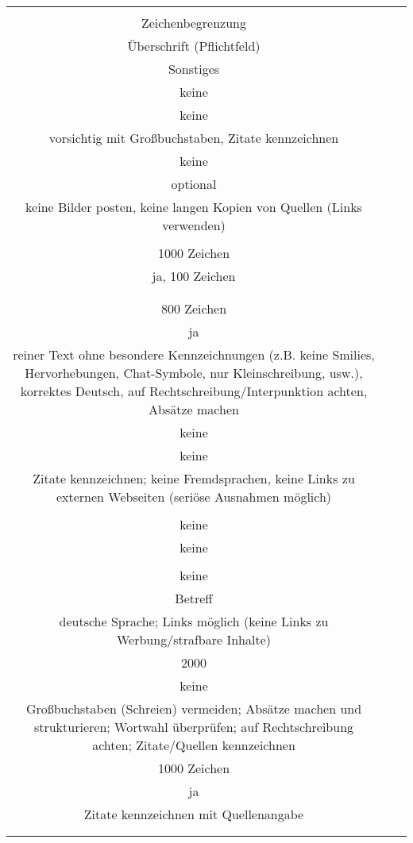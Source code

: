 \begin{landscape}
\begin{tabular}{ccc}
{Kommentar: formale Regeln\\
Zeichenbegrenzung\\
Überschrift (Pflichtfeld)\\
Sonstiges 
&		%
		\\
		keine\\
		keine\\
		vorsichtig mit Großbuchstaben, Zitate kennzeichnen	
		&
		\\
		keine\\
		optional\\
		keine Bilder posten, keine langen Kopien von Quellen (Links verwenden)\\
		&
		\\
		1000 Zeichen\\
		ja, 100 Zeichen\\
		\\
		&
		\\
		800 Zeichen\\
		ja\\
		reiner Text ohne besondere Kennzeichnungen (z.B. keine Smilies, Hervorhebungen, Chat-Symbole, nur Kleinschreibung, usw.), korrektes Deutsch, auf Rechtschreibung/Interpunktion achten, Absätze machen
		&
		\\
		keine\\
		keine\\
		Zitate kennzeichnen; keine Fremdsprachen, keine Links zu externen Webseiten (seriöse Ausnahmen möglich)\\
		&
		\\
		keine\\
		keine\\
		&
		\\
		keine\\
		Betreff\\
		deutsche Sprache; Links möglich (keine Links zu Werbung/strafbare Inhalte)
		&
		\\
		2000\\
		keine\\
		Großbuchstaben (Schreien) vermeiden; Absätze machen und strukturieren; Wortwahl überprüfen; auf Rechtschreibung achten; 				Zitate/Quellen kennzeichnen
		&
		\\
		1000 Zeichen\\
		ja\\
		Zitate kennzeichnen mit Quellenangabe\\
		&
		\\
}
\end{tabular}
\end{landscape}
